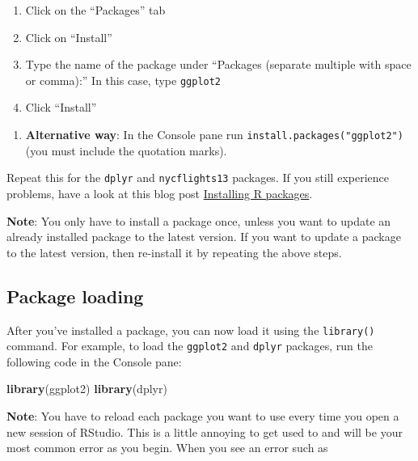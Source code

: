 \documentclass[
]{book}
\newenvironment{Shaded}{\begin{snugshade}}{\end{snugshade}}
\newcommand{\KeywordTok}[1]{\textcolor[rgb]{0.13,0.29,0.53}{\textbf{#1}}}
\newcommand{\NormalTok}[1]{#1}
\providecommand{\tightlist}{%
  \setlength{\itemsep}{0pt}\setlength{\parskip}{0pt}}
\begin{document}
\begin{enumerate}
\def\labelenumi{\alph{enumi})}
\tightlist
\item
  Click on the ``Packages'' tab
\item
  Click on ``Install''
\item
  Type the name of the package under ``Packages (separate multiple with space or comma):'' In this case, type \texttt{ggplot2}
\item
  Click ``Install''
\end{enumerate}

\begin{enumerate}
\def\labelenumi{\arabic{enumi}.}
\tightlist
\item
  \textbf{Alternative way}: In the Console pane run \texttt{install.packages("ggplot2")} (you must include the quotation marks).
\end{enumerate}

Repeat this for the \texttt{dplyr} and \texttt{nycflights13} packages. If you still experience problems, have a look at this blog post \href{https://www.r-bloggers.com/installing-r-packages/}{Installing R packages}.

\textbf{Note}: You only have to install a package once, unless you want to update an already installed package to the latest version. If you want to update a package to the latest version, then re-install it by repeating the above steps.

\hypertarget{package-loading}{%
\subsection{Package loading}\label{package-loading}}

After you've installed a package, you can now load it using the \texttt{library()} command. For example, to load the \texttt{ggplot2} and \texttt{dplyr} packages, run the following code in the Console pane:

\begin{Shaded}
\begin{Highlighting}[]
\KeywordTok{library}\NormalTok{(ggplot2)}
\KeywordTok{library}\NormalTok{(dplyr)}
\end{Highlighting}
\end{Shaded}

\textbf{Note}: You have to reload each package you want to use every time you open a new session of RStudio. This is a little annoying to get used to and will be your most common error as you begin. When you see an error such as
\end{document}
